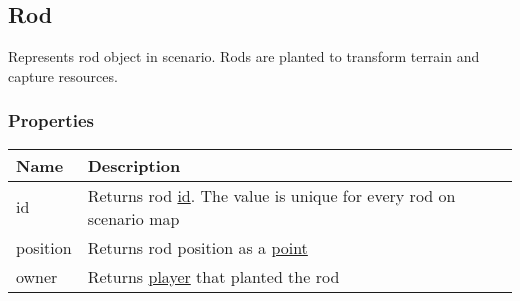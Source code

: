 \subsection{Rod}
\label{Rod}
Represents rod object in scenario. Rods are planted to transform terrain and capture resources.
\subsubsection{Properties}
\begin{center}
\begin{tabularx}{\linewidth}{| l | X |}
\hline
\textbf{Name} & \textbf{Description} \\
\hline
id & Returns rod \hyperref[Id]{id}. The value is unique for every rod on scenario map\\
\hline
position & Returns rod position as a \hyperref[Point]{point}\\
\hline
owner & Returns \hyperref[Player]{player} that planted the rod\\
\hline
\end{tabularx}
\end{center}